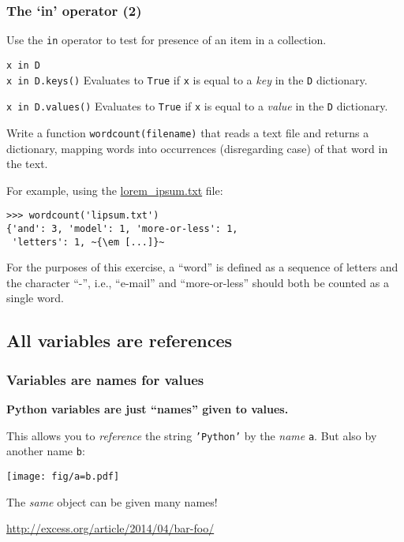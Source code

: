 \documentclass[english,serif,mathserif,xcolor=pdftex,dvipsnames,table]{beamer}
\begin{document}
\begin{frame}[fragile]
  \frametitle{The `{\ttfamily\bfseries in}' operator (2)}

  Use the \lstinline|in| operator to test for presence of an item in a
  collection.

  \begin{describe}{\lstinline|x in D| \\ \lstinline|x in D.keys()|}
    Evaluates to \texttt{True} if \lstinline|x| is equal to a \emph{key}
    in the \lstinline|D| dictionary.
  \end{describe}

  \begin{describe}{\lstinline|x in D.values()|}
    Evaluates to \texttt{True} if \lstinline|x| is equal to a \emph{value}
    in the \lstinline|D| dictionary.
  \end{describe}

\end{frame}


\begin{frame}[fragile]
\begin{exercise*}[7.A]
    Write a function \lstinline|wordcount(filename)| that reads a text
    file and returns a dictionary, mapping words into occurrences
    (disregarding case) of that word in the text.

    \+ For example, using the
    \href{https://raw.github.com/gc3-uzh-ch/python-course/master/lorem_ipsum.txt}{lorem\_ipsum.txt}
    file:
    \begin{lstlisting}
>>> wordcount('lipsum.txt')
{'and': 3, 'model': 1, 'more-or-less': 1,
 'letters': 1, ~{\em [...]}~
    \end{lstlisting}

    \+ For the purposes of this
    exercise, a ``word'' is defined as a sequence of letters and the
    character ``-'', i.e., ``e-mail'' and ``more-or-less'' should both
    be counted as a single word.
  \end{exercise*}
\end{frame}


\subsection{All variables are references}

\begin{frame}[fragile]
  \frametitle{Variables are names for values}

  \textbf{Python variables are just ``names'' given to values.}

  \+
  This allows you to \emph{reference} the string \texttt{'Python'}
  by the \emph{name} \texttt{a}.  But also by another name \texttt{b}:

  \+
  \texttt{[image: fig/a=b.pdf]}

  \+
  The \emph{same} object can be given many names!

  \+
  \begin{seealso}
    \scriptsize \url{http://excess.org/article/2014/04/bar-foo/}
  \end{seealso}
\end{frame}
\end{document}
